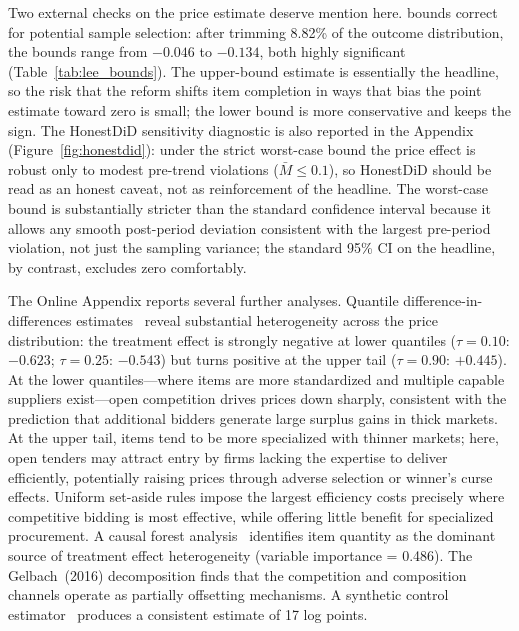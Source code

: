 Two external checks on the price estimate deserve mention here. \citet{lee2009} bounds correct for potential sample selection: after trimming 8.82\% of the outcome distribution, the bounds range from $-0.046$ to $-0.134$, both highly significant (Table~\ref{tab:lee_bounds}). The upper-bound estimate is essentially the headline, so the risk that the reform shifts item completion in ways that bias the point estimate toward zero is small; the lower bound is more conservative and keeps the sign. The \citet{rambachan2023} HonestDiD sensitivity diagnostic is also reported in the Appendix (Figure~\ref{fig:honestdid}): under the strict worst-case bound the price effect is robust only to modest pre-trend violations ($\bar M \leq 0.1$), so HonestDiD should be read as an honest caveat, not as reinforcement of the headline. The worst-case bound is substantially stricter than the standard confidence interval because it allows any smooth post-period deviation consistent with the largest pre-period violation, not just the sampling variance; the standard 95\% CI on the headline, by contrast, excludes zero comfortably.

The Online Appendix reports several further analyses. Quantile difference-in-differences estimates~\citep{canay2011} reveal substantial heterogeneity across the price distribution: the treatment effect is strongly negative at lower quantiles ($\tau=0.10$: $-0.623$; $\tau=0.25$: $-0.543$) but turns positive at the upper tail ($\tau=0.90$: $+0.445$). At the lower quantiles---where items are more standardized and multiple capable suppliers exist---open competition drives prices down sharply, consistent with the \citet{bulow1996} prediction that additional bidders generate large surplus gains in thick markets. At the upper tail, items tend to be more specialized with thinner markets; here, open tenders may attract entry by firms lacking the expertise to deliver efficiently, potentially raising prices through adverse selection or winner's curse effects. Uniform set-aside rules impose the largest efficiency costs precisely where competitive bidding is most effective, while offering little benefit for specialized procurement. A causal forest analysis~\citep{athey2019, wager2018} identifies item quantity as the dominant source of treatment effect heterogeneity (variable importance = 0.486). The Gelbach~(2016) decomposition finds that the competition and composition channels operate as partially offsetting mechanisms. A synthetic control estimator~\citep{abadie2010, ben2021} produces a consistent estimate of 17 log points.

